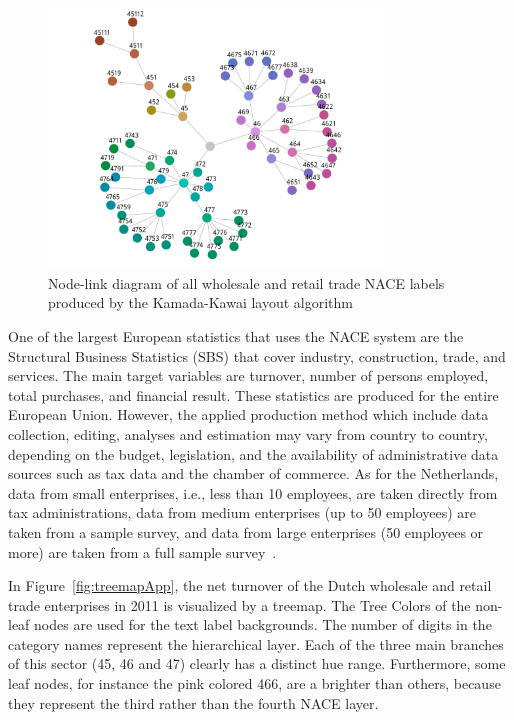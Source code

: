 \documentclass[journal]{vgtc}                %
\begin{document}
\begin{figure}[!b]
  \centering
  \includegraphics[width=3.5in]{Gbusiness_KK.pdf}
  \caption{Node-link diagram of all wholesale and retail trade NACE labels produced by the Kamada-Kawai layout algorithm}\label{fig:graphKKApp}
\end{figure}

One of the largest European statistics that uses the NACE system are the Structural Business Statistics (SBS) that cover industry, construction, trade, and services. The main target variables are turnover, number of persons employed, total purchases, and financial result. These statistics are produced for the entire European Union. However, the applied production method which include data collection, editing, analyses and estimation may vary from country to country, depending on the budget, legislation, and the availability of administrative data sources such as tax data and the chamber of commerce. As for the Netherlands, data from small enterprises, i.e., less than 10 employees, are taken directly from tax administrations, data from medium enterprises (up to 50 employees) are taken from a sample survey, and data from large enterprises (50 employees or more) are taken from a full sample survey~\cite{cbsSBS}.


In Figure~\ref{fig:treemapApp}, the net turnover of the Dutch wholesale and retail trade enterprises in 2011 is visualized by a treemap. The Tree Colors of the non-leaf nodes are used for the text label backgrounds. The number of digits in the category names represent the hierarchical layer. Each of the three main branches of this sector (45, 46 and 47) clearly has a distinct hue range. Furthermore, some leaf nodes, for instance the pink colored 466, are a brighter than others, because they represent the third rather than the fourth NACE layer.
\end{document}
